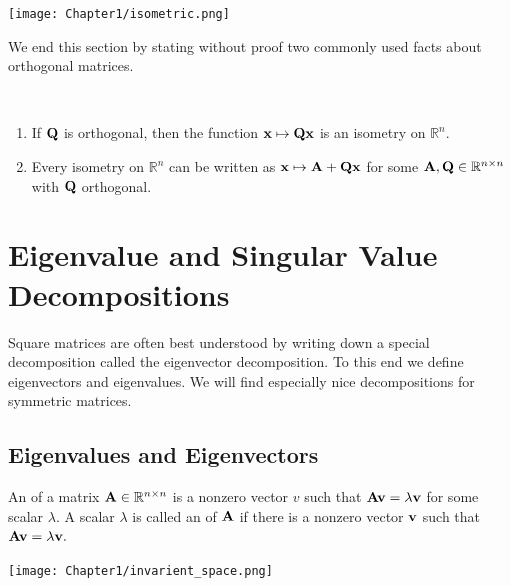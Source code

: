 \begin{center}
  \texttt{[image: Chapter1/isometric.png]}
\end{center}

We end this section by stating without proof two commonly used facts about orthogonal matrices.

\begin{proposition}\ 
\begin{enumerate}
    \item If $\MQ$ is orthogonal, then the function $\vx \mapsto \MQ\vx$ is an isometry on $\mathbb R^n.$
    \item Every isometry on $\mathbb R^n$ can be written as $\vx \mapsto \MA + \MQ\vx$ for some $\MA, \MQ \in \mathbb R^{n \times n}$ with $\MQ$ orthogonal.
\end{enumerate}

\end{proposition}

\section{Eigenvalue and Singular Value Decompositions}\label{eig-sing}

Square matrices are often best understood by writing down a special decomposition called the eigenvector decomposition. To this end we define eigenvectors and eigenvalues. We will find especially nice decompositions for symmetric matrices.

\subsection{Eigenvalues and Eigenvectors} 

\begin{definition}
An  of a matrix $\MA \in \mathbb R^{n \times n}$  is a nonzero vector $v$ such that $\MA\vv = \lambda \vv$ for some scalar $\lambda. $ A scalar $\lambda$ is called an  of $\MA$ if there is a nonzero vector $\vv$ such that $\MA\vv = \lambda \vv.$ 
\end{definition}

\begin{center}
  \texttt{[image: Chapter1/invarient\_space.png]}
\end{center}

